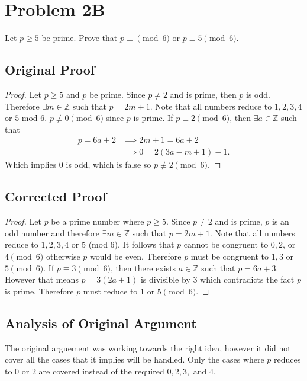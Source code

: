 \documentclass[12pt]{extarticle}
\begin{document}
\section*{Problem $\mathbf{2}$B}

Let $p \geq 5$ be prime. Prove that $p\equiv \pmod{6}$ or $p\equiv 5 \pmod{6}$.

\subsection*{Original Proof}

\begin{proof}
	Let $p \geq 5$ and $p$ be prime. Since $p \neq 2$ and is prime, then $p$ is odd. Therefore $\exists m \in \mathbb{Z}$ such that $p = 2m + 1$. Note that all numbers reduce to $1,2,3,4$ or $5$ mod $6$. $p \not\equiv 0 \pmod{6}$ since $p$ is prime. If $p \equiv 2 \pmod{6}$, then $\exists a \in \mathbb{Z}$ such that
	\begin{align*}
		p = 6a + 2 &\implies 2m + 1 = 6a + 2 \\
							 &\implies 0 = 2(3a - m + 1) - 1
	.\end{align*}
	Which implies $0$ is odd, which is false so $p \not\equiv 2 \pmod{6}$.
\end{proof}

\subsection*{Corrected Proof}

\begin{proof}
	Let $p$ be a prime number where $p \geq 5$. Since $p \neq 2$ and is prime, $p$ is an odd number and therefore $\exists m \in \mathbb{Z}$ such that $p = 2m + 1$. Note that all numbers reduce to $1,2,3,4$ or $5$ (mod $6$). It follows that $p$ cannot be congruent to $0, 2$, or $4\pmod{6}$ otherwise $p$ would be even. Therefore $p$ must be congruent to $1,3$ or $5 \pmod{6}$. If $p \equiv 3 \pmod{6}$, then there exists $a \in \mathbb{Z}$ such that $p = 6a + 3$. However that means $p = 3(2a + 1)$ is divisible by $3$ which contradicts the fact $p$ is prime. Therefore $p$ must reduce to $1$ or $5 \pmod{6}$. 
\end{proof}

\subsection*{Analysis of Original Argument}

The original arguement was working towards the right idea, however it did not cover all the cases that it implies will be handled. Only the cases where $p$ reduces to $0$ or $2$ are covered instead of the required $0,2,3,$ and $4$.
\end{document}
